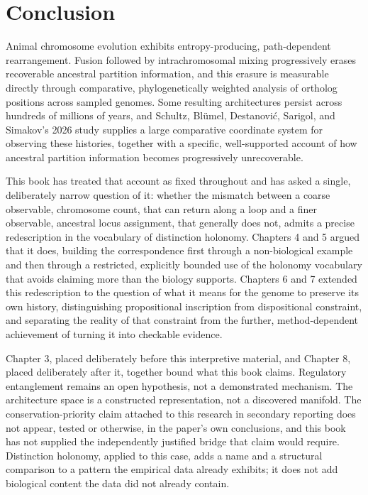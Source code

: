 \documentclass[11pt]{book}
\begin{document}
\chapter{Conclusion}

Animal chromosome evolution exhibits entropy-producing, path-dependent rearrangement. Fusion followed by intrachromosomal mixing progressively erases recoverable ancestral partition information, and this erasure is measurable directly through comparative, phylogenetically weighted analysis of ortholog positions across sampled genomes. Some resulting architectures persist across hundreds of millions of years, and Schultz, Bl\"umel, Destanovi\'c, Sarigol, and Simakov's 2026 study supplies a large comparative coordinate system for observing these histories, together with a specific, well-supported account of how ancestral partition information becomes progressively unrecoverable.

This book has treated that account as fixed throughout and has asked a single, deliberately narrow question of it: whether the mismatch between a coarse observable, chromosome count, that can return along a loop and a finer observable, ancestral locus assignment, that generally does not, admits a precise redescription in the vocabulary of distinction holonomy. Chapters 4 and 5 argued that it does, building the correspondence first through a non-biological example and then through a restricted, explicitly bounded use of the holonomy vocabulary that avoids claiming more than the biology supports. Chapters 6 and 7 extended this redescription to the question of what it means for the genome to preserve its own history, distinguishing propositional inscription from dispositional constraint, and separating the reality of that constraint from the further, method-dependent achievement of turning it into checkable evidence.

Chapter 3, placed deliberately before this interpretive material, and Chapter 8, placed deliberately after it, together bound what this book claims. Regulatory entanglement remains an open hypothesis, not a demonstrated mechanism. The architecture space is a constructed representation, not a discovered manifold. The conservation-priority claim attached to this research in secondary reporting does not appear, tested or otherwise, in the paper's own conclusions, and this book has not supplied the independently justified bridge that claim would require. Distinction holonomy, applied to this case, adds a name and a structural comparison to a pattern the empirical data already exhibits; it does not add biological content the data did not already contain.
\end{document}

